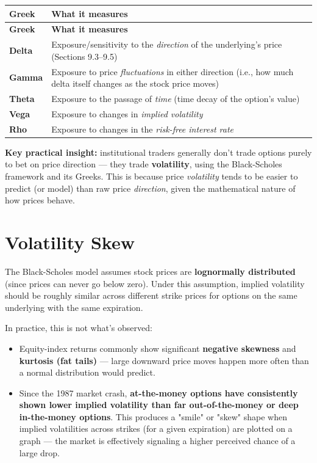\documentclass[12pt,openany]{book}
\theoremstyle{definition}
\theoremstyle{remark}
\begin{document}
\begingroup
\small
\begin{longtable}{@{}L{0.240\textwidth}L{0.690\textwidth}@{}}
\toprule
\textbf{Greek} & \textbf{What it measures} \\
\midrule
\endfirsthead
\toprule
\textbf{Greek} & \textbf{What it measures} \\
\midrule
\endhead
\textbf{Delta} & Exposure/sensitivity to the \emph{direction} of the underlying's price (Sections 9.3--9.5) \\
\textbf{Gamma} & Exposure to price \emph{fluctuations} in either direction (i.e., how much delta itself changes as the stock price moves) \\
\textbf{Theta} & Exposure to the passage of \emph{time} (time decay of the option's value) \\
\textbf{Vega} & Exposure to changes in \emph{implied volatility} \\
\textbf{Rho} & Exposure to changes in the \emph{risk-free interest rate} \\
\bottomrule
\end{longtable}
\endgroup

\textbf{Key practical insight:} institutional traders generally don't trade options purely to bet on price direction --- they trade \textbf{volatility}, using the Black-Scholes framework and its Greeks. This is because price \emph{volatility} tends to be easier to predict (or model) than raw price \emph{direction}, given the mathematical nature of how prices behave.

\section{Volatility Skew}

The Black-Scholes model assumes stock prices are \textbf{lognormally distributed} (since prices can never go below zero). Under this assumption, implied volatility should be roughly similar across different strike prices for options on the same underlying with the same expiration.

In practice, this is not what's observed:

\begin{itemize}
\item Equity-index returns commonly show significant \textbf{negative skewness} and \textbf{kurtosis (fat tails)} --- large downward price moves happen more often than a normal distribution would predict.


\item Since the 1987 market crash, \textbf{at-the-money options have consistently shown lower implied volatility than far out-of-the-money or deep in-the-money options}. This produces a "smile" or "skew" shape when implied volatilities across strikes (for a given expiration) are plotted on a graph --- the market is effectively signaling a higher perceived chance of a large drop.


\end{itemize}
\end{document}
